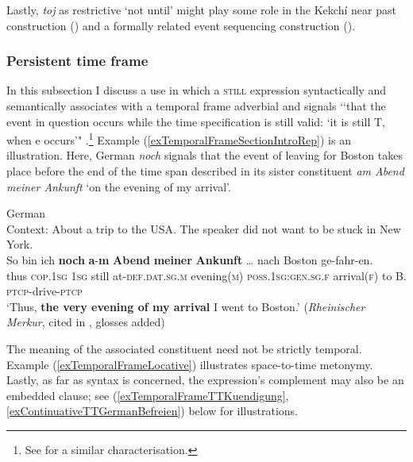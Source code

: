 Lastly, \textit{toj} as restrictive \lq not until\rq{ }might play some role in the Kekchí near past construction () and a formally related event sequencing construction ().

\subsubsection{Persistent time frame}
\label{sectionTemporalFrameTT}
In this subsection I discuss a use in which a \textsc{still} expression syntactically and semantically associates with a temporal frame adverbial and signals \lq\lq that the event in question occurs while the time specification is still valid: \lq it is still T, when e occurs'" \parencite[202]{Loebner1989}.\footnote{See \textcite[200]{Vandeweghe1992} for a similar characterisation.} Example (\ref{exTemporalFrameSectionIntroRep}) is an illustration. Here, German \textit{noch} signals that the event of leaving for Boston takes place before the end of the time span described in its sister constituent \textit{am Abend meiner Ankunft} \lq on the evening of my arrival\rq{}.

\begin{exe}
	\ex\label{exTemporalFrameSectionIntroRep} German\\
	Context: About a trip to the USA. The speaker did not want to be stuck in New York.\\
	\gll So bin ich \textbf{noch} \textbf{a}-\textbf{m} \textbf{Abend} \textbf{meiner} \textbf{Ankunft} … nach Boston ge-fahr-en.\\
thus \textsc{cop}.1\textsc{sg} 1\textsc{sg} still at-\textsc{def}.\textsc{dat}.\textsc{sg}.\textsc{m} evening(\textsc{m}) \textsc{poss}.1\textsc{sg}:\textsc{gen}.\textsc{sg}.\textsc{f} arrival(\textsc{f}) {} to B. \textsc{ptcp}-drive-\textsc{ptcp}\\
	\glt \lq Thus, \textbf{the very evening of my arrival} I went to Boston.\rq{ }(\textit{Rheinischer Merkur}, cited in \cite[57]{Shetter1966},  glosses added)
\end{exe}

The meaning of the associated constituent need not be strictly temporal. Example (\ref{exTemporalFrameLocative}) illustrates space-to-time metonymy. Lastly, as far as syntax is concerned, the expression's complement may also be an embedded clause; see (\ref{exTemporalFrameTTKuendigung}, \ref{exContinuativeTTGermanBefreien}) below for illustrations.

